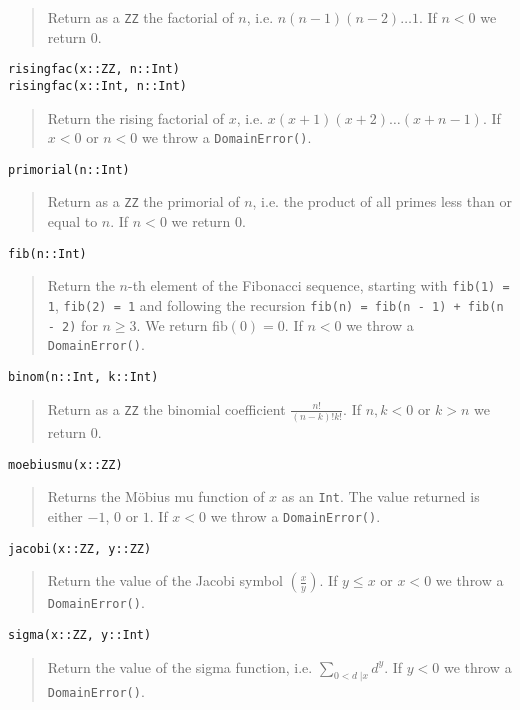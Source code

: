\documentclass[a4paper,10pt]{article}
\newcommand{\code}{\lstinline}
\newcommand{\desc}[1]{\vspace{-3mm}\begin{quote}#1\end{quote}}
\newcommand{\ljk}[2]{\left(\frac{#1}{#2}\right)}
\begin{document}
{{{\desc{Return as a \code{ZZ} the factorial of $n$, i.e. $n(n - 1)(n - 2)\ldots 1$.
If $n < 0$ we return $0$.}

\begin{lstlisting}
risingfac(x::ZZ, n::Int)
risingfac(x::Int, n::Int)
\end{lstlisting}

\desc{Return the rising factorial of $x$, i.e. $x(x + 1)(x + 2)\ldots (x + n - 1)$.
If $x < 0$ or $n < 0$ we throw a \code{DomainError()}.}

\begin{lstlisting}
primorial(n::Int)
\end{lstlisting}

\desc{Return as a \code{ZZ} the primorial of $n$, i.e. the product of all primes
less than or equal to $n$. If $n < 0$ we return $0$.}

\begin{lstlisting}
fib(n::Int)
\end{lstlisting}

\desc{Return the $n$-th element of the Fibonacci sequence, starting with 
\code{fib(1) = 1}, \code{fib(2) = 1} and following the recursion 
\code{fib(n) = fib(n - 1) + fib(n - 2)} for $n \geq 3$.
We return fib$(0) = 0$. If $n < 0$ we throw a \code{DomainError()}.}

\begin{lstlisting}
binom(n::Int, k::Int)
\end{lstlisting}

\desc{Return as a \code{ZZ} the binomial coefficient $\frac{n!}{(n - k)!k!}$. If
$n, k < 0$ or $k > n$ we return $0$.}

\begin{lstlisting}
moebiusmu(x::ZZ)
\end{lstlisting}

\desc{Returns the M\"{o}bius mu function of $x$ as an \code{Int}. The value returned is
either $-1$, $0$ or $1$. If $x < 0$ we throw a \code{DomainError()}.}

\begin{lstlisting}
jacobi(x::ZZ, y::ZZ)
\end{lstlisting}

\desc{Return the value of the Jacobi symbol $\ljk{x}{y}$. If $y \leq x$ or $x < 0$ we
throw a \code{DomainError()}.}

\begin{lstlisting}
sigma(x::ZZ, y::Int)
\end{lstlisting}

\desc{Return the value of the sigma function, i.e. $\sum_{0 < d \;| x} d^y$. If $y < 0$
we throw a \code{DomainError()}.}

}}}
\end{document}
